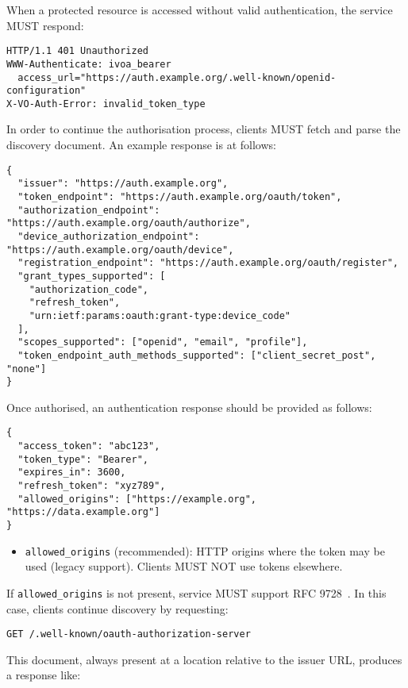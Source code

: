 \documentclass[11pt,a4paper]{ivoa}
\begin{document}
When a protected resource is accessed without valid authentication, the service MUST respond:

\begin{verbatim}
HTTP/1.1 401 Unauthorized
WWW-Authenticate: ivoa_bearer
  access_url="https://auth.example.org/.well-known/openid-configuration"
X-VO-Auth-Error: invalid_token_type
\end{verbatim}

In order to continue the authorisation process, clients MUST fetch and parse the discovery document.
An example response is at follows:

\begin{verbatim}
{
  "issuer": "https://auth.example.org",
  "token_endpoint": "https://auth.example.org/oauth/token",
  "authorization_endpoint": "https://auth.example.org/oauth/authorize",
  "device_authorization_endpoint": "https://auth.example.org/oauth/device",
  "registration_endpoint": "https://auth.example.org/oauth/register",
  "grant_types_supported": [
    "authorization_code",
    "refresh_token",
    "urn:ietf:params:oauth:grant-type:device_code"
  ],
  "scopes_supported": ["openid", "email", "profile"],
  "token_endpoint_auth_methods_supported": ["client_secret_post", "none"]
}
\end{verbatim}

Once authorised, an authentication response should be provided as follows:

\begin{verbatim}
{
  "access_token": "abc123",
  "token_type": "Bearer",
  "expires_in": 3600,
  "refresh_token": "xyz789",
  "allowed_origins": ["https://example.org", "https://data.example.org"]
}
\end{verbatim}

\begin{itemize}
  \item \texttt{allowed\_origins} (recommended): HTTP origins where the token may be used (legacy support). Clients MUST NOT use tokens elsewhere.
\end{itemize}

If \texttt{allowed\_origins} is not present, service MUST support RFC 9728~\citep{rfc9728}. In this case, clients continue
discovery by requesting:

\begin{verbatim}
GET /.well-known/oauth-authorization-server
\end{verbatim}

This document, always present at a location relative to the issuer URL, produces a response like:
\end{document}
